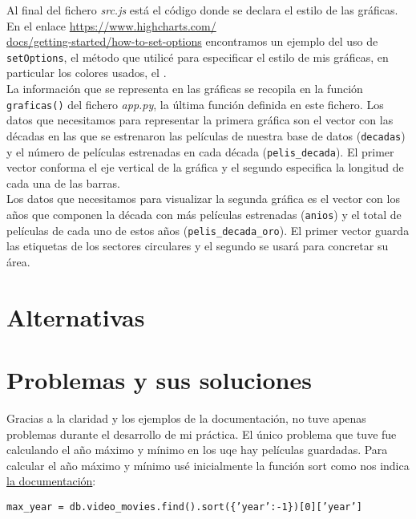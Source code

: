 \documentclass{article}
\begin{document}
Al final del fichero \textit{src.js} está el código donde se declara el estilo de las gráficas. En el enlace \href{https://www.highcharts.com/docs/getting-started/how-to-set-options}{https://www.highcharts.com/\\docs/getting-started/how-to-set-options} encontramos un ejemplo del uso de \texttt{setOptions}, el método que utilicé para especificar el estilo de mis gráficas, en particular los colores usados, el .\\

La información que se representa en las gráficas se recopila en la función \texttt{graficas()} del fichero \textit{app.py}, la última función definida en este fichero. Los datos que necesitamos para representar la primera gráfica son el vector con las décadas en las que se estrenaron las películas de nuestra base de datos (\texttt{decadas}) y el número de películas estrenadas en cada década (\texttt{pelis\_decada}). El primer vector conforma el eje vertical de la gráfica y el segundo especifica la longitud de cada una de las barras.\\

Los datos que necesitamos para visualizar la segunda gráfica es el vector con los años que componen la década con más películas estrenadas (\texttt{anios}) y el total de películas de cada uno de estos años (\texttt{pelis\_decada\_oro}). El primer vector guarda las etiquetas de los sectores circulares y el segundo se usará para concretar su área.\\

\section{Alternativas}

\section{Problemas y sus soluciones}

Gracias a la claridad y los ejemplos de la documentación, no tuve apenas problemas durante el desarrollo de mi práctica. El único problema que tuve fue calculando el año máximo y mínimo en los uqe hay películas guardadas.
Para calcular el año máximo y mínimo usé inicialmente la función sort como nos indica \href{https://docs.mongodb.com/manual/reference/method/cursor.sort/}{la documentación}:

\vspace{-1mm}
\begin{center}
  \texttt{max\_year = db.video\_movies.find().sort(\{'year':-1\})[0]['year']}
\end{center}
\end{document}
